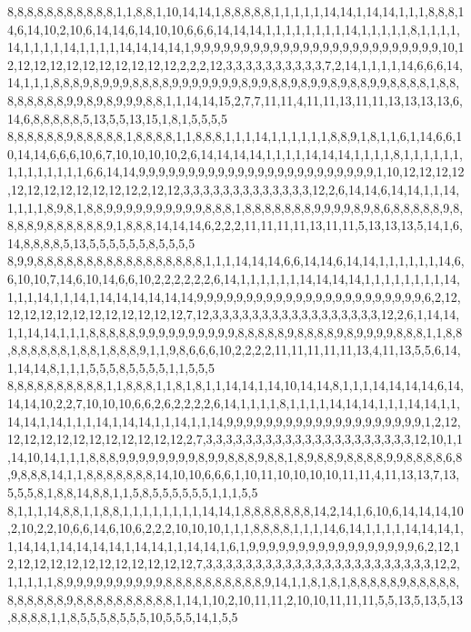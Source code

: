 8,8,8,8,8,8,8,8,8,8,8,1,1,8,8,1,10,14,14,1,8,8,8,8,8,1,1,1,1,1,14,14,1,14,14,1,1,1,8,8,8,14,6,14,10,2,10,6,14,14,6,14,10,10,6,6,6,14,14,14,1,1,1,1,1,1,1,1,14,1,1,1,1,1,8,1,1,1,1,14,1,1,1,1,14,1,1,1,1,14,14,14,14,1,9,9,9,9,9,9,9,9,9,9,9,9,9,9,9,9,9,9,9,9,9,9,9,9,9,10,12,12,12,12,12,12,12,12,12,12,12,2,2,2,12,3,3,3,3,3,3,3,3,3,3,7,2,14,1,1,1,1,14,6,6,6,14,14,1,1,1,8,8,8,9,8,9,9,9,8,8,8,8,9,9,9,9,9,9,9,8,9,9,8,8,9,8,9,9,8,9,8,8,9,9,8,8,8,8,1,8,8,8,8,8,8,8,8,9,9,8,9,8,9,9,9,8,8,1,1,14,14,15,2,7,7,11,11,4,11,11,13,11,11,13,13,13,13,6,14,6,8,8,8,8,8,5,13,5,5,13,15,1,8,1,5,5,5,5
8,8,8,8,8,8,9,8,8,8,8,8,1,8,8,8,8,1,1,8,8,8,1,1,1,14,1,1,1,1,1,1,8,8,9,1,8,1,1,6,1,14,6,6,10,14,14,6,6,6,10,6,7,10,10,10,10,2,6,14,14,14,14,1,1,1,1,14,14,14,1,1,1,1,8,1,1,1,1,1,1,1,1,1,1,1,1,1,1,6,6,14,14,9,9,9,9,9,9,9,9,9,9,9,9,9,9,9,9,9,9,9,9,9,9,9,9,1,10,12,12,12,12,12,12,12,12,12,12,12,12,2,12,12,3,3,3,3,3,3,3,3,3,3,3,3,3,12,2,6,14,14,6,14,14,1,1,14,1,1,1,1,8,9,8,1,8,8,9,9,9,9,9,9,9,9,9,9,8,8,8,1,8,8,8,8,8,8,8,9,9,9,9,8,9,8,6,8,8,8,8,8,9,8,8,8,8,9,8,8,8,8,8,8,9,1,8,8,8,14,14,14,6,2,2,2,11,11,11,11,13,11,11,5,13,13,13,5,14,1,6,14,8,8,8,8,5,13,5,5,5,5,5,5,8,5,5,5,5
8,9,9,8,8,8,8,8,8,8,8,8,8,8,8,8,8,8,8,8,1,1,1,14,14,14,6,6,14,14,6,14,14,1,1,1,1,1,1,14,6,6,10,10,7,14,6,10,14,6,6,10,2,2,2,2,2,2,6,14,1,1,1,1,1,1,14,14,14,14,1,1,1,1,1,1,1,1,14,1,1,1,14,1,1,14,1,14,14,14,14,14,14,9,9,9,9,9,9,9,9,9,9,9,9,9,9,9,9,9,9,9,9,9,9,9,6,2,12,12,12,12,12,12,12,12,12,12,12,12,7,12,3,3,3,3,3,3,3,3,3,3,3,3,3,3,3,3,3,12,2,6,1,14,14,1,1,14,14,1,1,1,8,8,8,8,8,9,9,9,9,9,9,9,9,9,9,8,8,8,8,8,9,8,8,8,8,9,8,9,9,9,9,8,8,8,1,1,8,8,8,8,8,8,8,8,1,8,8,1,8,8,8,9,1,1,9,8,6,6,6,10,2,2,2,2,11,11,11,11,11,13,4,11,13,5,5,6,14,1,14,14,8,1,1,1,5,5,5,8,5,5,5,5,1,1,5,5,5
8,8,8,8,8,8,8,8,8,8,1,1,8,8,8,1,1,8,1,8,1,1,14,14,1,14,10,14,14,8,1,1,1,14,14,14,14,6,14,14,14,10,2,2,7,10,10,10,6,6,2,6,2,2,2,2,6,14,1,1,1,1,8,1,1,1,1,14,14,14,1,1,1,14,14,1,1,14,14,1,14,1,1,1,14,1,14,14,1,1,14,1,1,14,9,9,9,9,9,9,9,9,9,9,9,9,9,9,9,9,9,9,9,9,1,2,12,12,12,12,12,12,12,12,12,12,12,12,2,7,3,3,3,3,3,3,3,3,3,3,3,3,3,3,3,3,3,3,3,3,3,12,10,1,1,14,10,14,1,1,1,8,8,8,9,9,9,9,9,9,9,9,8,9,9,8,8,8,9,8,8,1,8,9,8,8,9,8,8,8,8,9,9,8,8,8,8,6,8,9,8,8,8,14,1,1,8,8,8,8,8,8,8,14,10,10,6,6,6,1,10,11,10,10,10,10,11,11,4,11,13,13,7,13,5,5,5,8,1,8,8,14,8,8,1,1,5,8,5,5,5,5,5,5,1,1,1,5,5
8,1,1,1,14,8,8,1,1,8,8,1,1,1,1,1,1,1,1,14,14,1,8,8,8,8,8,8,8,14,2,14,1,6,10,6,14,14,14,10,2,10,2,2,10,6,6,14,6,10,6,2,2,2,10,10,10,1,1,1,8,8,8,8,1,1,1,14,6,14,1,1,1,1,14,14,14,1,1,14,14,1,14,14,14,14,1,14,14,1,1,14,14,1,6,1,9,9,9,9,9,9,9,9,9,9,9,9,9,9,9,9,9,6,2,12,12,12,12,12,12,12,12,12,12,12,12,12,7,3,3,3,3,3,3,3,3,3,3,3,3,3,3,3,3,3,3,3,3,3,3,3,12,2,1,1,1,1,1,8,9,9,9,9,9,9,9,9,9,9,8,8,8,8,8,8,8,8,8,8,9,14,1,1,8,1,8,1,8,8,8,8,8,9,8,8,8,8,8,8,8,8,8,8,8,9,8,8,8,8,8,8,8,8,8,8,1,14,1,10,2,10,11,11,2,10,10,11,11,11,5,5,13,5,13,5,13,8,8,8,8,1,1,8,5,5,5,8,5,5,5,10,5,5,5,14,1,5,5
